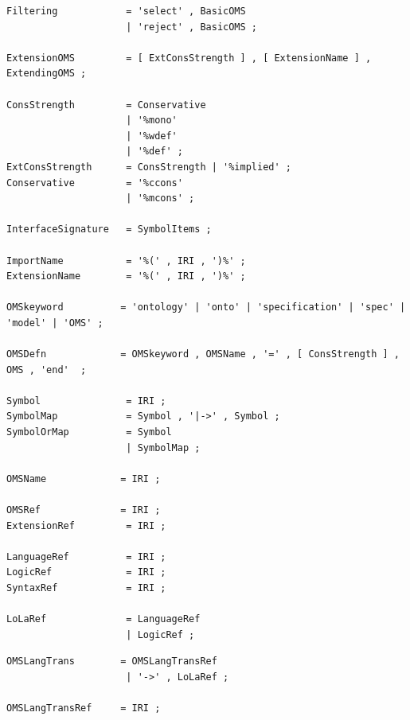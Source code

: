 \documentclass[10pt,fleqn,%
\ifpretendfinal
final%
\else
draft%
\fi,
]{scrreprt}
\begin{document}
\begin{lstlisting}[language=ebnf,escapeinside={<>},mathescape]
Filtering            = 'select' , BasicOMS 
                     | 'reject' , BasicOMS ;

ExtensionOMS         = [ ExtConsStrength ] , [ ExtensionName ] , ExtendingOMS ;

ConsStrength         = Conservative
                     | '%mono'
                     | '%wdef'
                     | '%def' ;
ExtConsStrength      = ConsStrength | '%implied' ;
Conservative         = '%ccons'
                     | '%mcons' ; 

InterfaceSignature   = SymbolItems ;

ImportName           = '%(' , IRI , ')%' ;
ExtensionName        = '%(' , IRI , ')%' ;

OMSkeyword          = 'ontology' | 'onto' | 'specification' | 'spec' | 'model' | 'OMS' ;

OMSDefn             = OMSkeyword , OMSName , '=' , [ ConsStrength ] , OMS , 'end'  ; 

Symbol               = IRI ;
SymbolMap            = Symbol , '|->' , Symbol ;
SymbolOrMap          = Symbol
                     | SymbolMap ;

OMSName             = IRI ;

OMSRef              = IRI ;
ExtensionRef         = IRI ;

LanguageRef          = IRI ;
LogicRef             = IRI ;
SyntaxRef            = IRI ;

LoLaRef              = LanguageRef
                     | LogicRef ;
\end{lstlisting}

\begin{lstlisting}[language=ebnf,mathescape]
OMSLangTrans        = OMSLangTransRef
                     | '->' , LoLaRef ;

OMSLangTransRef     = IRI ;
\end{lstlisting}

\end{document}

